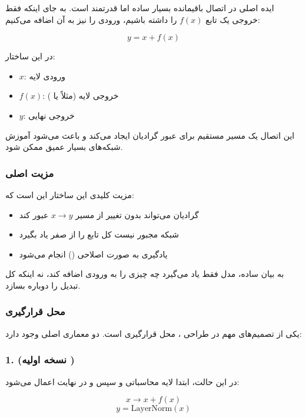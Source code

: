 \documentclass{article}
\begin{document}
ایده اصلی در اتصال باقیمانده بسیار ساده اما قدرتمند است. به جای اینکه فقط خروجی یک تابع \( f(x) \) را داشته باشیم، ورودی را نیز به آن اضافه می‌کنیم:

\[
y = x + f(x)
\]

در این ساختار:

\begin{itemize}
	\item \( x \): ورودی لایه
	\item \( f(x) \): خروجی لایه (مثلاً  یا )
	\item \( y \): خروجی نهایی
\end{itemize}

این اتصال یک مسیر مستقیم برای عبور گرادیان ایجاد می‌کند و باعث می‌شود آموزش شبکه‌های بسیار عمیق ممکن شود.

\subsubsection*{مزیت اصلی }

مزیت کلیدی این ساختار این است که:

\begin{itemize}
	\item گرادیان می‌تواند بدون تغییر از مسیر \( x \rightarrow y \) عبور کند
	\item شبکه مجبور نیست کل تابع را از صفر یاد بگیرد
	\item یادگیری به صورت اصلاحی () انجام می‌شود
\end{itemize}

به بیان ساده، مدل فقط یاد می‌گیرد چه چیزی را به ورودی اضافه کند، نه اینکه کل تبدیل را دوباره بسازد.

\subsubsection*{محل قرارگیری }

یکی از تصمیم‌های مهم در طراحی ، محل قرارگیری  است. دو معماری اصلی وجود دارد:

\subsubsection*{1.  (نسخه اولیه )}

در این حالت، ابتدا لایه محاسباتی و سپس  و در نهایت  اعمال می‌شود:

\[
x \rightarrow x + f(x)
\]
\[
y = \text{LayerNorm}(x)
\]
\end{document}
